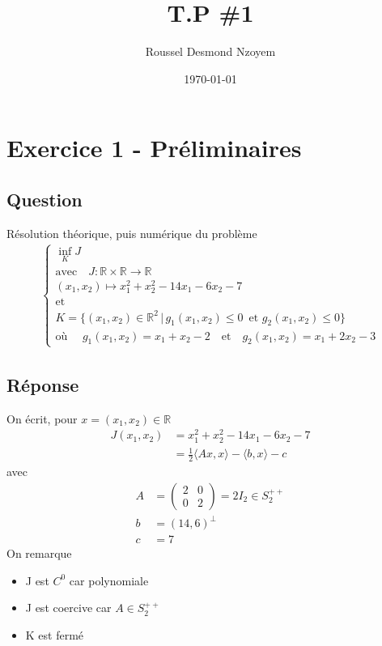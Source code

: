 \documentclass[
	french,
	11pt, %
]{fphw}
\title{T.P \#1} %
\author{Roussel Desmond Nzoyem} %
\date{\today} %
\institute{Université de Strasbourg \\ UFR de Mathématiques et Informatique} %
\newcommand{\mymat}[4]{\begin{pmatrix} #1 & #2 \\ #3 & #4 \end{pmatrix}}  %
\begin{document}
\maketitle %


\section*{Exercice 1 - Préliminaires}

\subsection*{Question}

\begin{problem}

Résolution théorique, puis numérique du problème
\begin{align*}
\begin{cases}
\inf_{K} J \\
\text{avec} \quad J: \mathbb{R}\times\mathbb{R} \to \mathbb{R} \\
(x_1, x_2) \mapsto x_1^2 + x_2^2 - 14x_1 - 6x_2 - 7 \\ 
\text{et} \\
K = \{(x_1, x_2) \in \mathbb{R}^2 \, | \, g_1(x_1,x_2) \leq 0 \, \text{   et   } g_2(x_1,x_2) \leq 0 \} \\
\text{où  } \quad g_1(x_1,x_2) = x_1 + x_2 -2 \quad \text{et} \quad g_2(x_1,x_2) = x_1 + 2x_2 -3
\end{cases}
\end{align*}

\end{problem}

\subsection*{Réponse}

On écrit, pour $x=(x_1,x_2) \in \mathbb{R}$
\begin{align*}
J(x_1, x_2) &= x_1^2 + x_2^2 - 14x_1 - 6x_2 - 7 \\
&= \frac{1}{2} \langle Ax,x \rangle - \langle b,x \rangle - c
\end{align*}
avec 
\begin{align*}
	A &= \mymat{2}{0}{0}{2} = 2I_2 \in S_2^{++} \\
	b &= \left(14,6\right) ^\bot \\
	c &= 7
\end{align*}
On remarque
\begin{itemize}
	\item J est $C^0$ car polynomiale
	\item J est coercive car $A \in S_2^{++}$
	\item K est fermé
\end{itemize}
\end{document}
